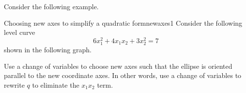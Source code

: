 Consider the following example. 

\begin{example}{Choosing new axes to simplify a quadratic form}{newaxes1}
Consider the following level curve
\[
6x_1^2 + 4x_1x_2 + 3x_2^2 = 7
\]
shown in the following graph. 
\begin{center}
\end{center}

Use a change of variables to choose new axes such that the ellipse is oriented parallel to the new coordinate axes. In other words, use a change of variables to rewrite $q$ to eliminate the $x_1x_2$ term. 
\end{example}


